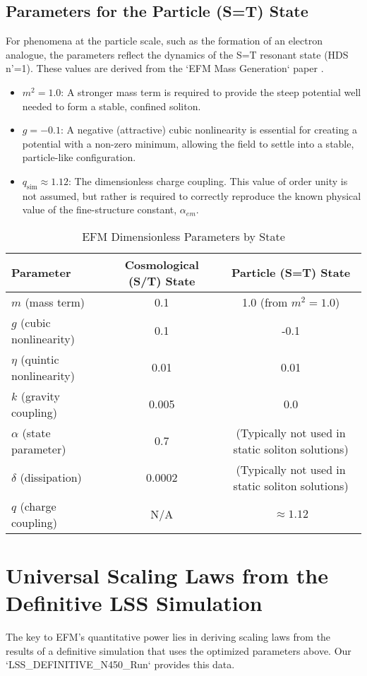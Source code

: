 \documentclass[11pt]{article}
\begin{document}
\subsection{Parameters for the Particle (S=T) State}
For phenomena at the particle scale, such as the formation of an electron analogue, the parameters reflect the dynamics of the S=T resonant state (HDS n'=1). These values are derived from the `EFM Mass Generation` paper \citep{emvula2025massgen}.
\begin{itemize}
    \item \textbf{$m^2 = 1.0$}: A stronger mass term is required to provide the steep potential well needed to form a stable, confined soliton.
    \item \textbf{$g = -0.1$}: A negative (attractive) cubic nonlinearity is essential for creating a potential with a non-zero minimum, allowing the field to settle into a stable, particle-like configuration.
    \item \textbf{$q_{\text{sim}} \approx 1.12$}: The dimensionless charge coupling. This value of order unity is not assumed, but rather is required to correctly reproduce the known physical value of the fine-structure constant, $\alpha_{em}$.
\end{itemize}

\begin{table}[h!]
\centering
\caption{EFM Dimensionless Parameters by State}
\label{tab:efm_params}
\begin{tabular}{@{}lcc@{}}
\toprule
\textbf{Parameter} & \textbf{Cosmological (S/T) State} & \textbf{Particle (S=T) State} \\ \midrule
$m$ (mass term) & 0.1 & 1.0 (from $m^2=1.0$) \\
$g$ (cubic nonlinearity) & 0.1 & -0.1 \\
$\eta$ (quintic nonlinearity) & 0.01 & 0.01 \\
$k$ (gravity coupling) & 0.005 & 0.0 \\
$\alpha$ (state parameter) & 0.7 & (Typically not used in static soliton solutions) \\
$\delta$ (dissipation) & 0.0002 & (Typically not used in static soliton solutions) \\
$q$ (charge coupling) & N/A & $\approx 1.12$ \\ \bottomrule
\end{tabular}
\end{table}


\section{Universal Scaling Laws from the Definitive LSS Simulation}
The key to EFM's quantitative power lies in deriving scaling laws from the results of a definitive simulation that uses the optimized parameters above. Our `LSS_DEFINITIVE_N450_Run` provides this data.
\end{document}
